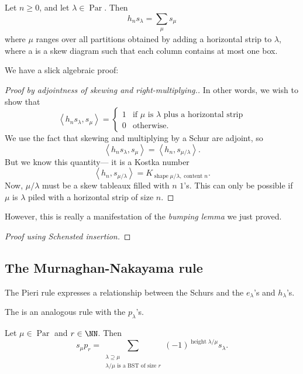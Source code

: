 \documentclass{article}
\newcommand{\InnerProduct}[1]{
    \ensuremath{
        \left\langle
            {#1}
        \right\rangle
    }
}
\DeclareMathOperator{\shape}{shape}
\DeclareMathOperator{\content}{content}
\DeclareMathOperator{\opheight}{height}
\DeclareMathOperator{\Par}{Par}
\begin{document}
\begin{theorem}
    Let $n \geq 0$, and let $\lambda \in \Par$.
    Then
    \[
        h_ns_\lambda = \sum_{\substack{\mu}} s_\mu
    \]
    where $\mu$ ranges over all partitions obtained by adding a horizontal strip to $\lambda$, where a  is a skew diagram such that each column contains at most one box.
\end{theorem}

We have a slick algebraic proof:

\begin{proof}
    [Proof by adjointness of skewing and right-multiplying.]
    In other words, we wish to show that
    \[
        \InnerProduct{h_ns_\lambda,s_\mu}
        =
        \begin{cases}
            1 & \text{if $\mu$ is $\lambda$ plus a horizontal strip} \\
            0 & \text{otherwise}.
        \end{cases}
    \]
    We use the fact that skewing and multiplying by a Schur are adjoint, so
    \[
        \InnerProduct{h_ns_\lambda,s_\mu}
        =
        \InnerProduct{h_n,s_{\mu/\lambda}}.
    \]
    But we know this quantity--- it is a Kostka number
    \[
        \InnerProduct{h_n,s_{\mu/\lambda}}
        =
        K_{\shape \mu/\lambda, \content n}.
    \]
    Now, $\mu / \lambda$ must be a skew tableaux filled with $n$ $1$'s.
    This can only be possible if $\mu$ is $\lambda$ piled with a horizontal strip of size $n$.
\end{proof}

However, this is really a manifestation of the \textit{bumping lemma} we just proved.

\begin{proof}
    [Proof using Schensted insertion]
\end{proof}




\subsection{The Murnaghan-Nakayama rule}

The Pieri rule expresses a relationship between the Schurs and the $e_\lambda$'s and $h_\lambda$'s.

The  is an analogous rule with the $p_\lambda$'s.


\begin{theorem} 
    Let $\mu \in \Par$ and $r \in \NN$.
    Then
    \[
        s_\mu p_r = \sum_{\substack{\lambda\supseteq\mu \\ \lambda / \mu \text{ is a BST of size }r}}(-1)^{\opheight \lambda / \mu} s_\lambda.
    \]
\end{theorem}
\end{document}
